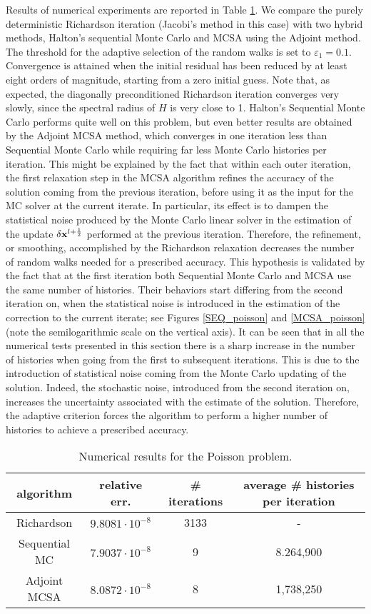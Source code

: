 \documentclass[final,leqno,onefignum,onetabnum]{siamltex1213}
\begin{document}
Results of numerical experiments are reported in Table \ref{Poisson_results}.
We compare the purely deterministic Richardson iteration (Jacobi's method
in this case) with two hybrid
methods, Halton's
sequential Monte Carlo and MCSA using the Adjoint method.
The threshold
for the adaptive selection of the random walks is set
to $\varepsilon_1=0.1$.
Convergence is attained when the initial residual has been reduced
by at least eight orders of magnitude, starting from a zero initial guess.
Note that, as expected, the diagonally preconditioned Richardson iteration
converges very slowly, since the spectral radius of $H$ is very close to 1.
Halton's Sequential Monte Carlo performs quite well on this problem, but
even better results are obtained by the Adjoint MCSA method, which converges
in one iteration less than Sequential Monte Carlo while requiring far less
Monte Carlo histories per iteration.
 This
might be explained by the fact that within each outer
iteration, the first relaxation step
in the MCSA algorithm refines the accuracy of the solution coming from the previous
iteration,
before using it as the input for the MC solver at the current iterate.
In particular,
its effect is to dampen the statistical noise
produced by the Monte Carlo linear solver in the estimation of the update $\delta
{\bf x}^{l + \frac{1}{2}}$ performed at the previous iteration. Therefore, the refinement,
or smoothing, accomplished by the Richardson relaxation decreases the number of
random walks needed
for a prescribed accuracy. This hypothesis is validated by the fact
that at the first iteration both Sequential Monte Carlo and MCSA use
the same number of histories. Their behaviors start differing from the
second iteration on, when the statistical noise is introduced in the estimation
of the correction to the current iterate;
see Figures \ref{SEQ_poisson} and
\ref{MCSA_poisson} (note the semilogarithmic scale on the vertical axis).
It can be seen that
in all the numerical tests presented in this section there is a sharp increase
in the number of histories when going from the first to subsequent iterations.
This is due to the introduction of statistical noise coming from the Monte Carlo
updating of the solution. Indeed, the stochastic noise, introduced from the
second iteration on, increases the uncertainty associated with the estimate
of the solution. Therefore, the adaptive criterion forces the algorithm
to perform a higher number of histories
to achieve a prescribed accuracy.

\begin{table}[!t]
\centering
\hspace*{-0.8cm}
\begin{tabular}{|c|c|c|c|}
\hline
algorithm & relative err.& \# iterations & average \# histories per iteration\\
\hline
Richardson & $9.8081\cdot 10^{-8}$ & 3133 & - \\
\hline
Sequential MC & $7.9037 \cdot 10^{-8}$ & 9 & 8.264,900\\
\hline
 Adjoint MCSA & $8.0872\cdot 10^{-8}$ & 8 & 1,738,250\\
\hline
\end{tabular}
\caption{Numerical results for the Poisson problem.}
\label{Poisson_results}
\end{table}
\end{document}
